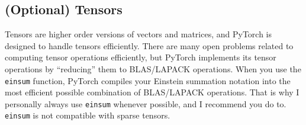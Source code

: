 \documentclass[10pt]{article}
\theoremstyle{definition}
\begin{document}

\subsection{(Optional) Tensors}

Tensors are higher order versions of vectors and matrices,
and PyTorch is designed to handle tensors efficiently.
There are many open problems related to computing tensor operations efficiently,
but PyTorch implements its tensor operations by ``reducing'' them to BLAS/LAPACK operations.
When you use the \texttt{einsum} function,
PyTorch compiles your Einstein summation notation into the most efficient possible combination of BLAS/LAPACK operations.
That is why I personally always use \texttt{einsum} whenever possible,
and I recommend you do to.
\texttt{einsum} is not compatible with sparse tensors.
\end{document}
